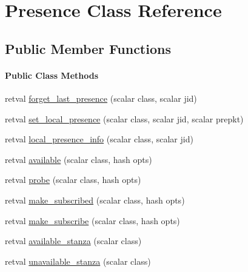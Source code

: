 \hypertarget{class_d_jabberd_1_1_presence}{
\section{\-Presence \-Class \-Reference}
\label{class_d_jabberd_1_1_presence}
}
\subsection*{\-Public \-Member \-Functions}
\begin{Indent}\paragraph*{\-Public \-Class \-Methods}
\begin{DoxyCompactItemize}
\item 
retval \hyperlink{class_d_jabberd_1_1_presence_afac95ca3bd6a367bf511e1b4cd991422}{forget\-\_\-last\-\_\-presence} (scalar class, scalar jid)
\item 
retval \hyperlink{class_d_jabberd_1_1_presence_a7071540c56eee1ab2ac5136f27e5db44}{set\-\_\-local\-\_\-presence} (scalar class, scalar jid, scalar prepkt)
\item 
retval \hyperlink{class_d_jabberd_1_1_presence_abe9c71d854fefe6575a98454fb2c568d}{local\-\_\-presence\-\_\-info} (scalar class, scalar jid)
\item 
retval \hyperlink{class_d_jabberd_1_1_presence_aafa652ca29f4549e7f2da18c64079f3b}{available} (scalar class, hash opts)
\item 
retval \hyperlink{class_d_jabberd_1_1_presence_a9d9d57fd7f0c8abda8c39bbb7aeca0af}{probe} (scalar class, hash opts)
\item 
retval \hyperlink{class_d_jabberd_1_1_presence_abb683ce0b130e1eba477a666511a6486}{make\-\_\-subscribed} (scalar class, hash opts)
\item 
retval \hyperlink{class_d_jabberd_1_1_presence_a79b3b153d13418cbc6760082270d281d}{make\-\_\-subscribe} (scalar class, hash opts)
\item 
retval \hyperlink{class_d_jabberd_1_1_presence_a7e1155f3e31770f59dec8933d6f2a3a3}{available\-\_\-stanza} (scalar class)
\item 
retval \hyperlink{class_d_jabberd_1_1_presence_a0aa7ede43356b848d8116199aa3bc150}{unavailable\-\_\-stanza} (scalar class)
\end{DoxyCompactItemize}
\end{Indent}
